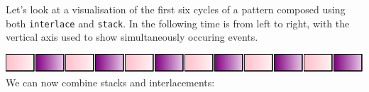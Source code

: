 \begin{Shaded}
\begin{Highlighting}[]
 \OtherTok{{-}\textgreater{}} 
\OtherTok{=}   \OperatorTok{$} 

\NormalTok{ [}\NormalTok{ a] }\OtherTok{{-}\textgreater{}} 
\OtherTok{=}\OperatorTok{$} 
  \OtherTok{=}
              \OtherTok{=}  \OperatorTok{$} 
\OtherTok{=}\OperatorTok{$}
\OtherTok{=}\OperatorTok{!!} \NormalTok{ (} \NormalTok{))}
\OtherTok{=}\OperatorTok{{-}}\OperatorTok{/}
\end{Highlighting}
\end{Shaded}

Let's look at a visualisation of the first six cycles of a pattern
composed using both \texttt{interlace} and \texttt{stack}. In the
following time is from left to right, with the vertical axis used to
show simultaneously occuring events.

\begin{Shaded}
\begin{Highlighting}[]
\OtherTok{=}\NormalTok{ interlace [atom }\NormalTok{]}
\end{Highlighting}
\end{Shaded}

\includegraphics{../figures/fig2.pdf}\\

We can now combine stacks and interlacements:

